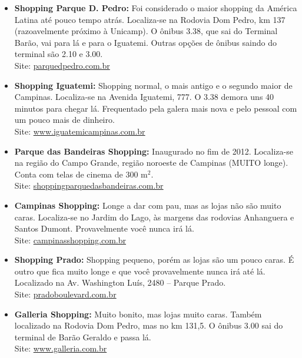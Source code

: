 \begin{itemize}
    \item   \textbf{Shopping Parque D. Pedro:} Foi considerado o maior shopping
        da América Latina até pouco tempo atrás. Localiza-se na Rodovia Dom
        Pedro, km 137 (razoavelmente próximo à Unicamp). O ônibus 3.38, que sai
        do Terminal Barão, vai para lá e para o Iguatemi. Outras opções de
        ônibus saindo do terminal são 2.10 e 3.00.
        \\Site: \url{parquedpedro.com.br}

    \item   \textbf{Shopping Iguatemi:} Shopping normal, o mais antigo e o
        segundo maior de Campinas. Localiza-se na Avenida Iguatemi, 777. O 3.38
        demora uns 40 minutos para chegar lá. Frequentado pela galera mais nova
        e pelo pessoal com um pouco mais de dinheiro.
        \\Site: \url{www.iguatemicampinas.com.br}

    \item   \textbf{Parque das Bandeiras Shopping:} Inaugurado no fim de 2012.
        Localiza-se na região do Campo Grande, região noroeste de Campinas
        (MUITO longe). Conta com telas de cinema de 300 m$^{2}$.
        \\Site: \url{shoppingparquedasbandeiras.com.br}

    \item   \textbf{Campinas Shopping:} Longe a dar com pau, mas as lojas não
        são muito caras. Localiza-se no Jardim do Lago, às margens das rodovias
        Anhanguera e Santos Dumont. Provavelmente você nunca irá lá.
        \\Site: \url{campinasshopping.com.br}

    \item   \textbf{Shopping Prado:} Shopping pequeno, porém as lojas são um
        pouco caras. É outro que fica muito longe e que você provavelmente
        nunca irá até lá. Localizado na Av. Washington Luís, 2480 -- Parque
        Prado.
        \\Site: \url{pradoboulevard.com.br}

    \item   \textbf{Galleria Shopping:} Muito bonito, mas lojas muito caras.
        Também localizado na Rodovia Dom Pedro, mas no km 131,5. O ônibus 3.00
        sai do terminal de Barão Geraldo e passa lá.
        \\Site: \url{www.galleria.com.br}


\end{itemize}
